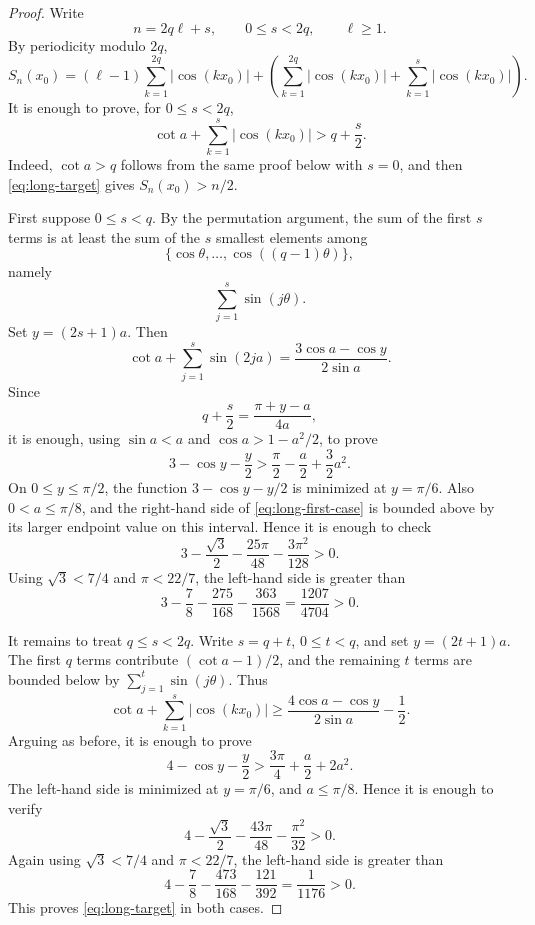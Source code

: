 \documentclass[11pt]{article}
\begin{document}
\begin{proof}
Write
\[
        n=2q\ell+s,\qquad 0\le s<2q,\qquad \ell\ge1.
\]
By periodicity modulo \(2q\),
\[
        S_n(x_0)=(\ell-1)\sum_{k=1}^{2q}|\cos(kx_0)|
        +
        \left(
        \sum_{k=1}^{2q}|\cos(kx_0)|
        +
        \sum_{k=1}^{s}|\cos(kx_0)|
        \right).
\]
It is enough to prove, for \(0\le s<2q\),
\[
        \cot a+\sum_{k=1}^{s}|\cos(kx_0)|
        > q+\frac s2.
        \tag{2}\label{eq:long-target}
\]
Indeed, \(\cot a>q\) follows from the same proof below with \(s=0\), and then \eqref{eq:long-target} gives \(S_n(x_0)>n/2\).

First suppose \(0\le s<q\). By the permutation argument, the sum of the first \(s\) terms is at least the sum of the \(s\) smallest elements among
\[
        \{\cos\theta,\dots,\cos((q-1)\theta)\},
\]
namely
\[
        \sum_{j=1}^{s}\sin(j\theta).
\]
Set \(y=(2s+1)a\). Then
\[
        \cot a+\sum_{j=1}^{s}\sin(2ja)
        =
        \frac{3\cos a-\cos y}{2\sin a}.
\]
Since
\[
        q+\frac s2=\frac{\pi+y-a}{4a},
\]
it is enough, using \(\sin a<a\) and \(\cos a>1-a^2/2\), to prove
\[
        3-\cos y-\frac y2
        >
        \frac{\pi}{2}-\frac a2+\frac32a^2.
        \tag{3}\label{eq:long-first-case}
\]
On \(0\le y\le\pi/2\), the function \(3-\cos y-y/2\) is minimized at \(y=\pi/6\). Also \(0<a\le\pi/8\), and the right-hand side of \eqref{eq:long-first-case} is bounded above by its larger endpoint value on this interval. Hence it is enough to check
\[
        3-\frac{\sqrt3}{2}
        -\frac{25\pi}{48}
        -\frac{3\pi^2}{128}>0.
\]
Using \(\sqrt3<7/4\) and \(\pi<22/7\), the left-hand side is greater than
\[
        3-\frac78-\frac{275}{168}-\frac{363}{1568}
        =
        \frac{1207}{4704}>0.
\]

It remains to treat \(q\le s<2q\). Write \(s=q+t\), \(0\le t<q\), and set \(y=(2t+1)a\). The first \(q\) terms contribute \((\cot a-1)/2\), and the remaining \(t\) terms are bounded below by \(\sum_{j=1}^t\sin(j\theta)\). Thus
\[
        \cot a+\sum_{k=1}^{s}|\cos(kx_0)|
        \ge
        \frac{4\cos a-\cos y}{2\sin a}-\frac12.
\]
Arguing as before, it is enough to prove
\[
        4-\cos y-\frac y2
        >
        \frac{3\pi}{4}+\frac a2+2a^2.
\]
The left-hand side is minimized at \(y=\pi/6\), and \(a\le\pi/8\). Hence it is enough to verify
\[
        4-\frac{\sqrt3}{2}
        -\frac{43\pi}{48}
        -\frac{\pi^2}{32}>0.
\]
Again using \(\sqrt3<7/4\) and \(\pi<22/7\), the left-hand side is greater than
\[
        4-\frac78-\frac{473}{168}-\frac{121}{392}
        =
        \frac1{1176}>0.
\]
This proves \eqref{eq:long-target} in both cases.
\end{proof}
\end{document}
